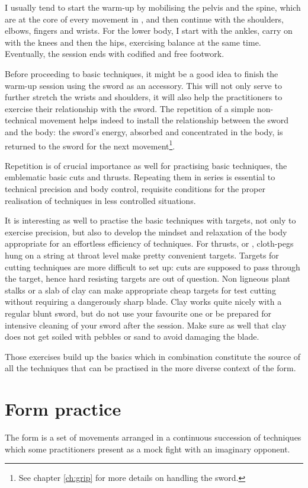 I usually tend to start the warm-up by mobilising the pelvis and the spine, which are at the core of every movement in \Taiji{}, and then continue with the shoulders, elbows, fingers and wrists.
For the lower body, I start with the ankles, carry on with the knees and then the hips, exercising balance at the same time.
Eventually, the session ends with codified and free footwork.

Before proceeding to basic techniques, it might be a good idea to finish the warm-up session using the sword as an accessory.
This will not only serve to further stretch the wrists and shoulders, it will also help the practitioners to exercise their relationship with the sword.
The repetition of a simple non-technical movement helps indeed to install the relationship between the sword and the body: the sword's energy, absorbed and concentrated in the body, is returned to the sword for the next movement\footnote{See chapter \ref*{ch:grip} for more details on handling the sword.}.

Repetition is of crucial importance as well for practising basic techniques, the emblematic basic cuts and thrusts. Repeating them in series is essential to technical precision and body control, requisite conditions for the proper realisation of techniques in less controlled situations.

It is interesting as well to practise the basic techniques with targets, not only to exercise precision, but also to develop the mindset and relaxation of the body appropriate for an effortless efficiency of techniques.
For thrusts, \Ci{} or \Zha{}, cloth-pegs hung on a string at throat level make pretty convenient targets.
Targets for cutting techniques are more difficult to set up: cuts are supposed to pass through the target, hence hard resisting targets are out of question. Non ligneous plant stalks or a slab of clay can make appropriate cheap targets for test cutting without requiring a dangerously sharp blade. Clay works quite nicely with a regular blunt sword, but do not use your favourite one or be prepared for intensive cleaning of your sword after the session. Make sure as well that clay does not get soiled with pebbles or sand to avoid damaging the blade.

Those exercises build up the basics which in combination constitute the source of all the techniques that can be practised in the more diverse context of the form.


\section{Form practice}
The form is a set of movements arranged in a continuous succession of techniques which some practitioners present as a mock fight with an imaginary opponent.

